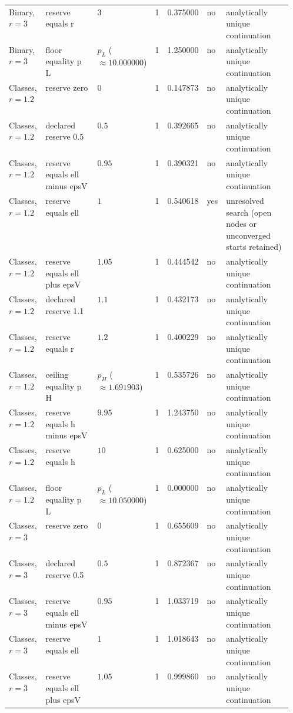 \begin{landscape}
\begin{longtable}{@{}p{0.13\linewidth}p{0.19\linewidth}lrrlp{0.24\linewidth}@{}}
Binary, $r=3$ & reserve equals r & $3$ & 1 & 0.375000 & no & analytically unique continuation \\
Binary, $r=3$ & floor equality p L & $p_L$ ($\approx 10.000000$) & 1 & 1.250000 & no & analytically unique continuation \\
Classes, $r=1.2$ & reserve zero & $0$ & 1 & 0.147873 & no & analytically unique continuation \\
Classes, $r=1.2$ & declared reserve 0.5 & $0.5$ & 1 & 0.392665 & no & analytically unique continuation \\
Classes, $r=1.2$ & reserve equals ell minus epsV & $0.95$ & 1 & 0.390321 & no & analytically unique continuation \\
Classes, $r=1.2$ & reserve equals ell & $1$ & 1 & 0.540618 & yes & unresolved search (open nodes or unconverged starts retained) \\
Classes, $r=1.2$ & reserve equals ell plus epsV & $1.05$ & 1 & 0.444542 & no & analytically unique continuation \\
Classes, $r=1.2$ & declared reserve 1.1 & $1.1$ & 1 & 0.432173 & no & analytically unique continuation \\
Classes, $r=1.2$ & reserve equals r & $1.2$ & 1 & 0.400229 & no & analytically unique continuation \\
Classes, $r=1.2$ & ceiling equality p H & $p_H$ ($\approx 1.691903$) & 1 & 0.535726 & no & analytically unique continuation \\
Classes, $r=1.2$ & reserve equals h minus epsV & $9.95$ & 1 & 1.243750 & no & analytically unique continuation \\
Classes, $r=1.2$ & reserve equals h & $10$ & 1 & 0.625000 & no & analytically unique continuation \\
Classes, $r=1.2$ & floor equality p L & $p_L$ ($\approx 10.050000$) & 1 & 0.000000 & no & analytically unique continuation \\
Classes, $r=3$ & reserve zero & $0$ & 1 & 0.655609 & no & analytically unique continuation \\
Classes, $r=3$ & declared reserve 0.5 & $0.5$ & 1 & 0.872367 & no & analytically unique continuation \\
Classes, $r=3$ & reserve equals ell minus epsV & $0.95$ & 1 & 1.033719 & no & analytically unique continuation \\
Classes, $r=3$ & reserve equals ell & $1$ & 1 & 1.018643 & no & analytically unique continuation \\
Classes, $r=3$ & reserve equals ell plus epsV & $1.05$ & 1 & 0.999860 & no & analytically unique continuation \\

\end{longtable}
\end{landscape}
